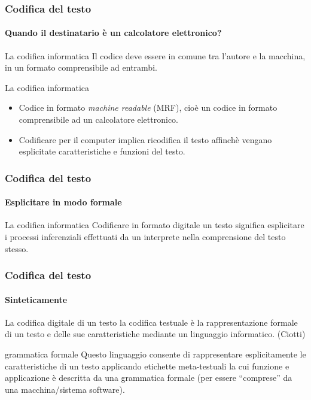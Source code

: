 \begin{frame}
	\frametitle{Codifica del testo}
	\framesubtitle{Quando il destinatario è un calcolatore elettronico?}
	\addtocounter{nframe}{1}

	\begin{block}{La codifica informatica}
		Il codice deve essere in comune tra l'autore e la macchina, in un formato comprensibile ad entrambi.
	\end{block}

	\begin{block}{La codifica informatica}
		\begin{itemize}
			\item Codice in formato \textit{machine readable} (MRF), cioè un codice in formato comprensibile ad un calcolatore elettronico.
			\item Codificare per il computer implica ricodifica il testo affinchè vengano esplicitate caratteristiche e funzioni del testo.
		\end{itemize}
	\end{block}

\end{frame}

\begin{frame}
	\frametitle{Codifica del testo}
	\framesubtitle{Esplicitare in modo formale}
	\addtocounter{nframe}{1}

	\begin{block}{La codifica informatica}
		Codificare in formato digitale un testo significa esplicitare i processi inferenziali effettuati da un interprete nella comprensione del testo stesso.
	\end{block}


\end{frame}


\begin{frame}
	\frametitle{Codifica del testo}
	\framesubtitle{Sinteticamente}
	\addtocounter{nframe}{1}

	\begin{block}{La codifica digitale di un testo}
		la codifica testuale è la rappresentazione formale di un testo e delle sue caratteristiche mediante un linguaggio informatico. (Ciotti)
	\end{block}

	\begin{block}{grammatica formale}
		Questo linguaggio consente di rappresentare esplicitamente le caratteristiche di un testo applicando etichette meta-testuali la cui funzione e applicazione è descritta da una grammatica formale (per essere ``comprese'' da una macchina/sistema software).
	\end{block}
\end{frame}

